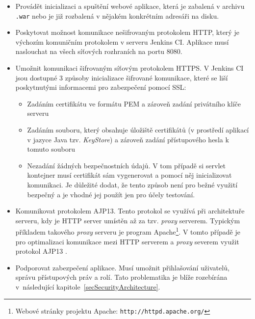             \begin{itemize}
                \item Provádět inicializaci a spuštění webové aplikace, která je zabalená v archivu \texttt{.war}
                    nebo je již rozbalená v nějakém konkrétním adresáři na disku.
                
                \item Poskytovat možnost komunikace nešifrovaným protokolem HTTP, který je výchozím
                    komuničním protokolem v serveru Jenkins CI.  Aplikace musí naslouchat na všech síťových rozhraních na portu 8080.
                
                \item Umožnit komunikaci šifrovaným síťovým protokolem HTTPS. V Jenkins CI jsou dostupné 
                    3 způsoby inicializace šifrované komunikace, které se liší poskytnutými informacemi pro 
                    zabezpečení pomocí SSL:
                    \begin{itemize}
                        \item Zadáním certifikátu ve formátu PEM a zároveň zadání privátního klíče serveru
                        \item Zadáním souboru, který obsahuje úložiště certifikátů (v prostředí aplikací v jazyce Java tzv. \emph{KeyStore}) a zároveň zadání 
                            přístupového hesla k tomuto souboru
                        \item Nezadání žádných bezpečnostních údajů. V tom případě si servlet kontejner musí certifikát sám
                            vygenerovat a pomocí něj inicializovat komunikaci. Je důležité dodat, že tento způsob
                            není pro bežné využití bezpečný a je vhodné jej použít jen pro účely testování.
                    \end{itemize} 

                \item Komunikovat protokolem AJP13. Tento protokol se využívá při architektuře serveru,
                    kdy je HTTP server umístěn až za tzv. \emph{proxy} serverem. Typickým příkladem takového
                    \emph{proxy} serveru je program Apache\footnote{Webové stránky projektu Apache: 
                    \texttt{http://httpd.apache.org/}}. V tomto případě je pro optimalizaci komunikace mezi HTTP serverem
                    a \emph{proxy} severem využit protokol AJP13 \cite{ajp13Web}.

                \item Podporovat zabezpečení aplikace. Musí umožnit přihlašování uživatelů, správu přístupových práv a rolí.
                    Tato problematika je blíže rozebírána v~následující kapitole~\ref{secSecurityArchitecture}.
                    

\end{itemize}
